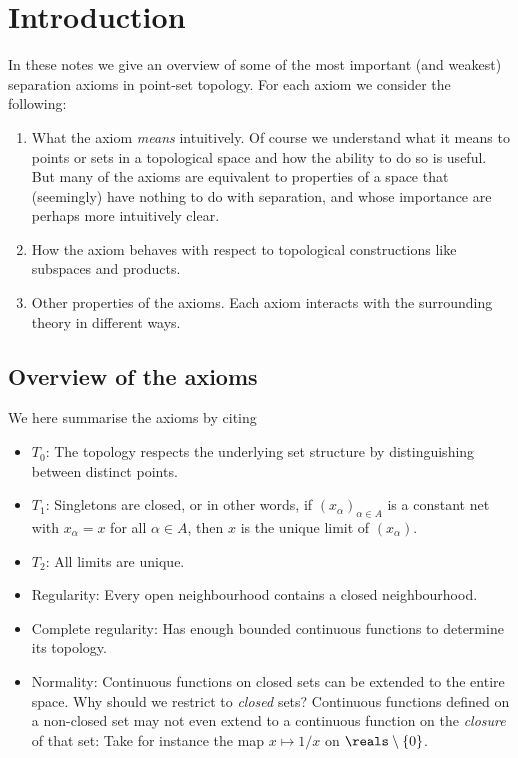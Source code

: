 \documentclass[article, a4paper, 11pt, oneside]{memoir}
\title{\doctitle}
\author{\docauthor}
\numberwithin{equation}{chapter}
\begin{document}
\maketitle

\chapter{Introduction}

In these notes we give an overview of some of the most important (and weakest) separation axioms in point-set topology. For each axiom we consider the following:

\begin{enumerate}
    \item What the axiom \emph{means} intuitively. Of course we understand what it means to  points or sets in a topological space and how the ability to do so is useful. But many of the axioms are equivalent to properties of a space that (seemingly) have nothing to do with separation, and whose importance are perhaps more intuitively clear.

    \item How the axiom behaves with respect to topological constructions like subspaces and products.
    
    \item Other properties of the axioms. Each axiom interacts with the surrounding theory in different ways.
\end{enumerate}


\section{Overview of the axioms}

We here summarise the axioms by citing

\begin{itemize}
    \item $T_0$: The topology respects the underlying set structure by distinguishing between distinct points.
    
    \item $T_1$: Singletons are closed, or in other words, if $(x_\alpha)_{\alpha \in A}$ is a constant net with $x_\alpha = x$ for all $\alpha \in A$, then $x$ is the unique limit of $(x_\alpha)$.
    
    \item $T_2$: All limits are unique.
    
    \item Regularity: Every open neighbourhood contains a closed neighbourhood.
    
    \item Complete regularity: Has enough bounded continuous functions to determine its topology.
    
    \item Normality: Continuous functions on closed sets can be extended to the entire space. Why should we restrict to \emph{closed} sets? Continuous functions defined on a non-closed set may not even extend to a continuous function on the \emph{closure} of that set: Take for instance the map $x \mapsto 1/x$ on $\reals \setminus \{0\}$.
\end{itemize}
\end{document}
